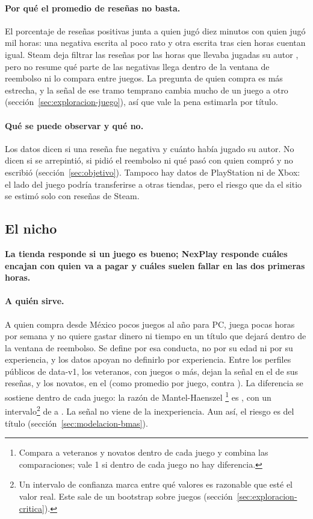 \paragraph{Por qué el promedio de reseñas no basta.} El porcentaje de reseñas positivas junta a
quien jugó diez minutos con quien jugó mil horas: una negativa escrita al poco rato y otra escrita
tras cien horas cuentan igual. Steam deja filtrar las reseñas por las horas que llevaba jugadas su
autor \parencite{bailey2019}, pero no resume qué parte de las negativas llega dentro de la ventana
de reembolso ni lo compara entre juegos. La pregunta de quien compra es más estrecha, y la señal de
ese tramo temprano cambia mucho de un juego a otro (sección~\ref{sec:exploracion-juego}), así que
vale la pena estimarla por título.

\paragraph{Qué se puede observar y qué no.} Los datos dicen si una reseña fue negativa y cuánto
había jugado su autor. No dicen si se arrepintió, si pidió el reembolso ni qué pasó con quien
compró y no escribió (sección~\ref{sec:objetivo}). Tampoco hay datos de PlayStation ni de Xbox: el
lado del juego podría transferirse a otras tiendas, pero el riesgo que da el sitio se estimó solo
con reseñas de Steam.

\subsection{El nicho}\label{sec:nicho}

\textbf{La tienda responde si un juego es bueno; NexPlay responde cuáles encajan con quien va a pagar
y cuáles suelen fallar en las dos primeras horas.}

\paragraph{A quién sirve.} A quien compra desde México pocos juegos al año para PC, juega pocas horas
por semana y no quiere gastar dinero ni tiempo en un título que dejará dentro de la ventana de
reembolso. Se define por esa conducta, no por su edad ni por su experiencia, y los datos apoyan no
definirlo por experiencia. Entre los perfiles públicos de data-v1, los veteranos, con
\cifraUmbralVeterano{} juegos o más, dejan la señal en el \cifraVeteranosPorResena{} de sus reseñas, y
los novatos, en el \cifraNovatosPorResena{} (como promedio por juego, \cifraVeteranosPromJuegos{}
contra \cifraNovatosPromJuegos{}). La diferencia se sostiene dentro de cada juego: la razón de
Mantel-Haenszel \parencite{mantel1959}\footnote{Compara a veteranos y novatos
dentro de cada juego y combina las comparaciones; vale 1 si dentro de cada juego no hay
diferencia.} es \cifraRazonMH{}, con un intervalo\footnote{Un intervalo de confianza marca entre qué
valores es razonable que esté el valor real. Este sale de un bootstrap sobre juegos
(sección~\ref{sec:exploracion-critica}).} de
\cifraRazonMHICInf{} a \cifraRazonMHICSup{}. La señal no viene de la inexperiencia. Aun así, el riesgo es
del título (sección~\ref{sec:modelacion-bmas}).

